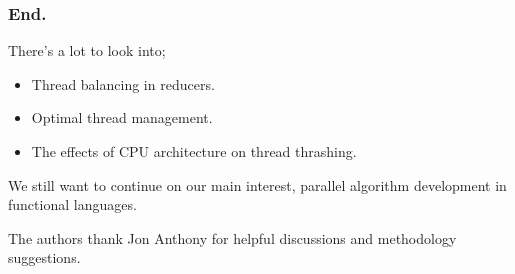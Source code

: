 \documentclass{beamer}
\begin{document}
\begin{frame}
\frametitle{End.}
	There's a lot to look into;
	\begin{itemize}
	\item Thread balancing in reducers.
	\item Optimal thread management.
	\item The effects of CPU architecture on thread thrashing.
	\end{itemize}
We still want to continue on our main interest, parallel algorithm development in functional languages.
\break

The authors thank Jon Anthony for helpful discussions and methodology suggestions. 
\end{frame}
\end{document}
